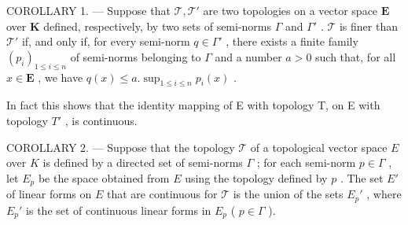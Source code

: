 COROLLARY 1. --- Suppose that \(\mathcal{T}, \mathcal{T}'\) are two topologies on a vector space \(\mathbf{E}\) over \(\mathbf{K}\) defined, respectively, by two sets of semi-norms \(\Gamma\) and \(\Gamma'\) . \(\mathcal{T}\) is finer than \(\mathcal{T}'\) if, and only if, for every semi-norm \(q \in \Gamma'\) , there exists a finite family \((p_i)_{1 \leqslant i \leqslant n}\) of semi-norms belonging to \(\Gamma\) and a number \(a > 0\) such that, for all \(x \in \mathbf{E}\) , we have \(q(x) \leqslant a . \sup_{1 \leqslant i \leqslant n} p_i(x)\) .

In fact this shows that the identity mapping of E with topology T, on E with topology \(T'\) , is continuous.

COROLLARY 2. --- Suppose that the topology \(\mathcal{T}\) of a topological vector space \(E\) over \(K\) is defined by a directed set of semi-norms \(\Gamma\) ; for each semi-norm \(p \in \Gamma\) , let \(E_p\) be the space obtained from \(E\) using the topology defined by \(p\) . The set \(E'\) of linear forms on \(E\) that are continuous for \(\mathcal{T}\) is the union of the sets \(E_p'\) , where \(E_p'\) is the set of continuous linear forms in \(E_p\) ( \(p \in \Gamma\) ).

